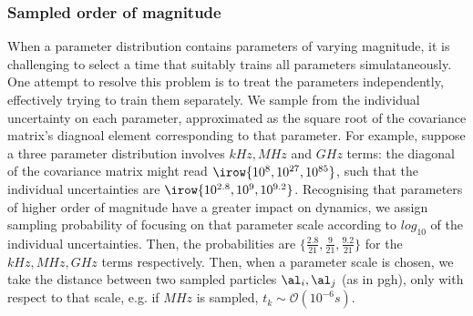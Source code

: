 \subsubsection{Sampled order of magnitude}
When a parameter distribution contains parameters of varying magnitude, 
    it is challenging to select a time that suitably trains all parameters simulataneously. 
One attempt to resolve this problem is to treat the parameters independently, 
    effectively trying to train them separately. 
We sample from the individual uncertainty on each parameter, 
    approximated as the square root of the covariance matrix's diagnoal element 
    corresponding to that parameter. 
For example, suppose a three parameter distribution involves $kHz, MHz$ and $GHz$ terms:
    the diagonal of the covariance matrix might read $\irow{10^{8}, 10^{27}, 10^{85}}$, 
    such that the individual uncertainties are $\irow{10^{2.8}, 10^{9}, 10^{9.2}}$.
Recognising that parameters of higher order of magnitude have a greater impact on dynamics, 
    we assign sampling probability of focusing on that parameter scale according to $log_{10}$ of the individual uncertainties. 
Then, the probabilities are $\{\frac{2.8}{21}, \frac{9}{21}, \frac{9.2}{21} \}$ for the $kHz, MHz, GHz$ terms respectively. 
Then, when a parameter scale is chosen, we take the distance between two sampled particles $\al_i, \al_j$ (as in \gls{pgh}),
    only with respect to that scale, e.g. if $MHz$ is sampled, $t_k \sim \mathcal{O}(10^{-6}s)$.
